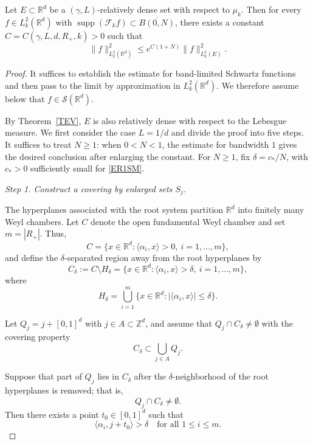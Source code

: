 \documentclass[12pt]{article}
\DeclareMathOperator{\supp}{supp}
\begin{document}
\begin{lemma}
\label{thm:suff}
Let $E \subset \mathbb{R}^d$ be a $(\gamma,L)$-relatively dense set with respect to $\mu_k$. Then for every $f \in L_k^2(\mathbb{R}^d)$ with $\supp(\mathcal{F}_k f) \subset \overline{B(0,N)}$, there exists a constant $C = C(\gamma, L, d, R_+, k) > 0$ such that
\begin{equation}
\label{eq:LS}
\| f \|_{L_k^2(\mathbb{R}^d)}^2 \leq e^{C(1+N)} \| f \|_{L_k^2(E)}^2.
\end{equation}
\end{lemma}

\begin{proof}
It suffices to establish the estimate for band-limited Schwartz functions and then pass to the limit by approximation in $L_k^2(\mathbb{R}^d)$. We therefore assume below that $f\in\mathcal{S}(\mathbb{R}^d)$.

By Theorem~\ref{TEV}, $E$ is also relatively dense with respect to the Lebesgue measure.
We first consider the case $L=1/d$ and divide the proof into five steps. It suffices to treat $N\ge1$: when $0<N<1$, the estimate for bandwidth $1$ gives the desired conclusion after enlarging the constant. For $N\ge1$, fix $\delta=c_*/N$, with $c_*>0$ sufficiently small for \eqref{ER1SM}.

\emph{Step 1. Construct a covering by enlarged sets $S_j$.}
 
The hyperplanes associated with the root system partition $\mathbb{R}^d$ into finitely many Weyl chambers. Let $C$ denote the open fundamental Weyl chamber and set $m=|R_+|$. Thus,
\[
C = \{x \in \mathbb{R}^d : \langle \alpha_i, x \rangle > 0,\ i = 1,\dots,m\},
\]
and define the $\delta$-separated region away from the root hyperplanes by
\[
C_\delta := C \setminus H_\delta = \{x \in \mathbb{R}^d : \langle \alpha_i, x \rangle > \delta,\ i = 1,\dots,m\},
\]
where
\[
H_\delta = \bigcup_{i=1}^m \bigl\{x \in \mathbb{R}^d : \big|\langle \alpha_i,x\rangle\big| \leq \delta\bigr\}.
\]

Let $Q_j = j + [0,1]^d$ with $j \in A \subset \mathbb{Z}^d$, and assume that $Q_j \cap C_\delta \neq \emptyset$ with the covering property
\[
C_\delta \subset \bigcup_{j\in A} Q_j.
\]


Suppose that part of $Q_j$ lies in $C_\delta$ after the $\delta$-neighborhood of the root hyperplanes is removed; that is,
\[
Q_j \cap C_\delta \neq \emptyset.
\]
Then there exists a point $t_0 \in [0,1]^d$ such that
\[
\langle \alpha_i, j + t_0 \rangle > \delta \quad \text{for all } 1\leq i\leq m.
\]


\end{proof}
\end{document}
